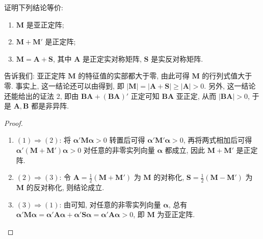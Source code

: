 \documentclass[../../main.tex]{subfiles}%
\begin{document}
\begin{theorem}\label{theorem:亚正定阵的等价条件}
证明下列结论等价:
\begin{enumerate}[(1)]
\item \(\boldsymbol{M}\) 是亚正定阵;
\item \(\boldsymbol{M}+\boldsymbol{M}'\) 是正定阵;
\item \(\boldsymbol{M}=\boldsymbol{A}+\boldsymbol{S}\), 其中 \(\boldsymbol{A}\) 是正定实对称矩阵, \(\boldsymbol{S}\) 是实反对称矩阵.
\end{enumerate}
\end{theorem}
\begin{remark}
告诉我们: 亚正定阵 \(\boldsymbol{M}\) 的特征值的实部都大于零, 由此可得 \(\boldsymbol{M}\) 的行列式值大于零. 事实上, 这一结论还可以由得到, 即 \(|\boldsymbol{M}|=|\boldsymbol{A}+\boldsymbol{S}|\geqslant |\boldsymbol{A}|>0\). 另外, 这一结论还能给出的证法 2, 即由 \(\boldsymbol{B}\boldsymbol{A}+(\boldsymbol{B}\boldsymbol{A})'\) 正定可知 \(\boldsymbol{B}\boldsymbol{A}\) 亚正定, 从而 \(|\boldsymbol{B}\boldsymbol{A}|>0\), 于是 \(\boldsymbol{A},\boldsymbol{B}\) 都是非异阵. 
\end{remark}
\begin{proof}
\begin{enumerate}
\item \((1)\Rightarrow(2)\): 将 \(\boldsymbol{\alpha}'\boldsymbol{M}\boldsymbol{\alpha}>0\) 转置后可得 \(\boldsymbol{\alpha}'\boldsymbol{M}'\boldsymbol{\alpha}>0\), 再将两式相加后可得 \(\boldsymbol{\alpha}'(\boldsymbol{M}+\boldsymbol{M}')\boldsymbol{\alpha}>0\) 对任意的非零实列向量 \(\boldsymbol{\alpha}\) 都成立, 因此 \(\boldsymbol{M}+\boldsymbol{M}'\) 是正定阵.
\item \((2)\Rightarrow(3)\): 令 \(\boldsymbol{A}=\frac{1}{2}(\boldsymbol{M}+\boldsymbol{M}')\) 为 \(\boldsymbol{M}\) 的对称化, \(\boldsymbol{S}=\frac{1}{2}(\boldsymbol{M}-\boldsymbol{M}')\) 为 \(\boldsymbol{M}\) 的反对称化, 则结论成立.
\item \((3)\Rightarrow(1)\): 由可知, 对任意的非零实列向量 \(\boldsymbol{\alpha}\), 总有 \(\boldsymbol{\alpha}'\boldsymbol{M}\boldsymbol{\alpha}=\boldsymbol{\alpha}'\boldsymbol{A}\boldsymbol{\alpha}+\boldsymbol{\alpha}'\boldsymbol{S}\boldsymbol{\alpha}=\boldsymbol{\alpha}'\boldsymbol{A}\boldsymbol{\alpha}>0\), 即 \(\boldsymbol{M}\) 为亚正定阵. 
\end{enumerate}
\end{proof}
\end{document}
